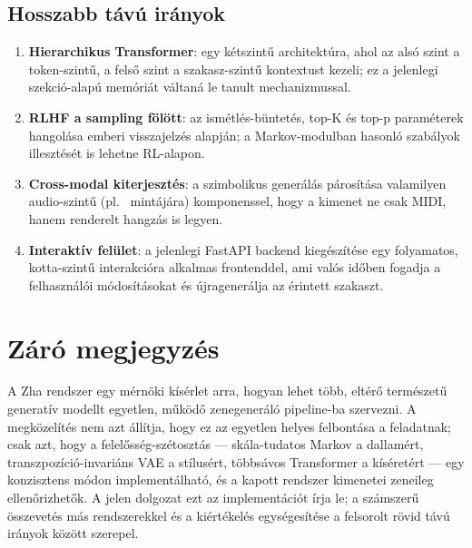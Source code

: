 \subsection{Hosszabb távú irányok}

\begin{enumerate}
  \item \textbf{Hierarchikus Transformer}: egy kétszintű architektúra, ahol az alsó szint a token-szintű, a felső szint a szakasz-szintű kontextust kezeli; ez a jelenlegi szekció-alapú memóriát váltaná le tanult mechanizmussal.

  \item \textbf{RLHF a sampling fölött}: az ismétlés-büntetés, top-K és top-p paraméterek hangolása emberi visszajelzés alapján; a Markov-modulban hasonló szabályok illesztését is lehetne RL-alapon.

  \item \textbf{Cross-modal kiterjesztés}: a szimbolikus generálás párosítása valamilyen audio-szintű (pl.\ \cite{copet2024simple} mintájára) komponenssel, hogy a kimenet ne csak MIDI, hanem renderelt hangzás is legyen.

  \item \textbf{Interaktív felület}: a jelenlegi FastAPI backend kiegészítése egy folyamatos, kotta-szintű interakcióra alkalmas frontenddel, ami valós időben fogadja a felhasználói módosításokat és újragenerálja az érintett szakaszt.
\end{enumerate}

\section{Záró megjegyzés}

A Zha rendszer egy mérnöki kísérlet arra, hogyan lehet több, eltérő természetű generatív modellt egyetlen, működő zenegeneráló pipeline-ba szervezni. A megközelítés nem azt állítja, hogy ez az egyetlen helyes felbontása a feladatnak; csak azt, hogy a felelősség-szétosztás --- skála-tudatos Markov a dallamért, transzpozíció-invariáns VAE a stílusért, többsávos Transformer a kíséretért --- egy konzisztens módon implementálható, és a kapott rendszer kimenetei zeneileg ellenőrizhetők. A jelen dolgozat ezt az implementációt írja le; a számszerű összevetés más rendszerekkel és a kiértékelés egységesítése a felsorolt rövid távú irányok között szerepel.
